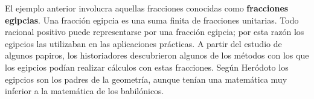 El ejemplo anterior involucra aquellas fracciones conocidas como
\textbf{fracciones egipcias}. Una fracción egipcia es una suma finita de
fracciones unitarias.  Todo racional positivo puede representarse por una
fracción egipcia; por esta razón los egipcios las utilizaban en las
aplicaciones prácticas.  A partir del estudio de algunos papiros, los
historiadores descubrieron algunos de los métodos con los que los egipcios
podían realizar cálculos con estas fracciones. 
Según Heródoto los egipcios son los padres de la geometría, aunque tenían una
matemática muy inferior a la matemática de los babilónicos.  

